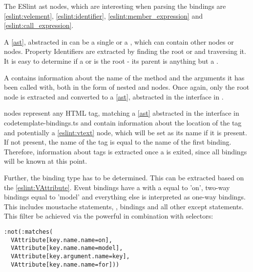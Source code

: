 The ESlint \gls{ast} nodes, which are interesting when parsing the bindings are  \ref{eslint:velement}, 
 \ref{eslint:identifier},  \ref{eslint:member_expression} and  \ref{eslint:call_expression}. 

A  \ref{ast}, abstracted
in   can be a single  or a , which can contain other  nodes or  nodes. Property Identifiers are extracted by finding the root  or  and traversing it. It is easy to determine if a  or  is the root - its parent is anything but a .

A  contains information about the name of the method and the arguments it has been called with, both in the form of nested  and  nodes. Once again, only the root  node is extracted and converted to a  \ref{ast}, abstracted in the  interface in .

 nodes represent any HTML tag, matching a  \ref{ast} abstracted in the  interface in code{template-bindings.ts} and contain information about the location of the tag and potentially a  \ref{eslint:vtext} node, which will be set as its name if it is present. If not present, the name of the tag is equal to the name of the first binding. Therefore, information about tags is extracted once a  is exited, since all bindings will be known at this point.

Further, the binding type has to be determined. This can be extracted based on the  \ref{eslint:VAttribute}. Event bindings have a  with a  equal to 'on', two-way bindings equal to 'model' and everything else is interpreted as one-way bindings. This includes moustache statements, ,  bindings and all other except  statements. This filter be achieved via the powerful  in combination with  selectors: 
\begin{lstlisting}
:not(:matches(
  VAttribute[key.name.name=on], 
  VAttribute[key.name.name=model],
  VAttribute[key.argument.name=key],
  VAttribute[key.name.name=for]))
\end{lstlisting}

